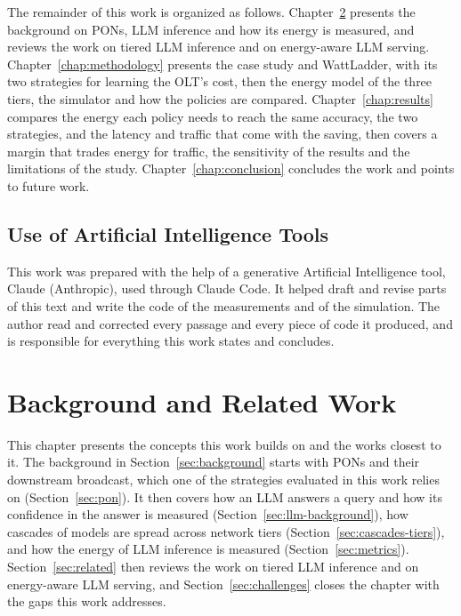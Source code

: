 \documentclass[cic,dipl,english]{infufrgs}
\begin{document}
The remainder of this work is organized as follows. Chapter~\ref{chap:review}
presents the background on PONs, LLM inference and how its energy is measured, and
reviews the work on tiered LLM inference and on energy-aware LLM serving.
Chapter~\ref{chap:methodology} presents the case study and WattLadder, with its two strategies
for learning the OLT's cost, then the energy model of the three tiers, the simulator and how the
policies are compared. Chapter~\ref{chap:results} compares the energy each policy needs to reach
the same accuracy, the two strategies, and the latency and traffic that come with the saving,
then covers a margin that trades energy for traffic, the sensitivity of the results and the
limitations of the study. Chapter~\ref{chap:conclusion} concludes the work and points to future
work.

\section{Use of Artificial Intelligence Tools}
\label{sec:ai-tools}
This work was prepared with the help of a generative Artificial Intelligence tool,
Claude (Anthropic), used through Claude Code. It helped draft and revise parts of this
text and write the code of the measurements and of the simulation. The author read and corrected every passage and every piece of code
it produced, and is responsible for everything this work states and concludes.

\chapter{Background and Related Work}
\label{chap:review}


This chapter presents the concepts this work builds on and the works closest to it. The background in
Section~\ref{sec:background} starts with PONs and their downstream broadcast, which one
of the strategies evaluated in this work relies on (Section~\ref{sec:pon}). It then
covers how an LLM answers a query and how its confidence in the answer is measured
(Section~\ref{sec:llm-background}), how cascades of models are spread across network
tiers (Section~\ref{sec:cascades-tiers}), and how the energy of LLM inference is measured
(Section~\ref{sec:metrics}). Section~\ref{sec:related} then reviews the work on
tiered LLM inference and on energy-aware LLM serving, and Section~\ref{sec:challenges}
closes the chapter with the gaps this work addresses.
\end{document}

